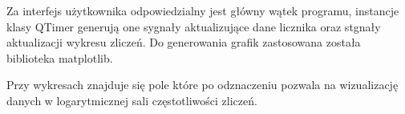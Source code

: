 Za interfejs użytkownika odpowiedzialny jest główny wątek programu, instancje klasy QTimer\cite{doc pyqt} generują one sygnały aktualizujące dane licznika oraz stgnały aktualizacji wykresu zliczeń. 
Do generowania grafik zastosowana została biblioteka matplotlib\cite{doc matplotlib}. 

Przy wykresach znajduje się pole które po odznaczeniu pozwala na wizualizację danych w logarytmicznej sali częstotliwości zliczeń.
